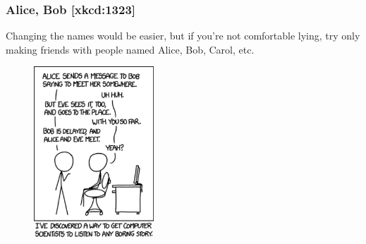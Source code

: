 \begin{frame}\frametitle{Alice, Bob  [xkcd:1323]}
Changing the names would be easier, but if you're not comfortable lying, try only making friends with people named Alice, Bob, Carol, etc.
\begin{figure}
\begin{center}
\includegraphics[width=45mm]{pic/alice-bob} 
\end{center}
\end{figure}
\end{frame}


